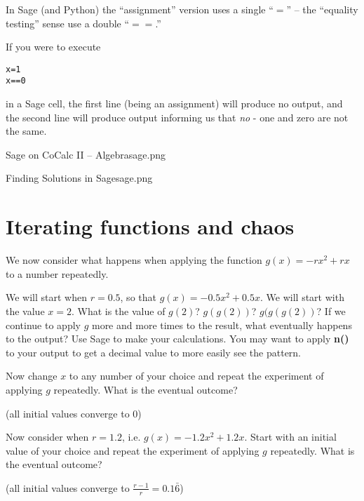 In Sage (and Python) the ``assignment'' version uses a single ``$=$'' -- the ``equality testing'' sense use a double ``$==$.''  

If you were to execute 

\begin{codeblock}
\begin{verbatim}
x=1
x==0
\end{verbatim}
\end{codeblock}

\noindent in a Sage cell, the first line (being an assignment) will produce no output, and the second line will produce output informing us that {\em no} - one and zero are not the same.


\begin{worksheet}{8}{Sage on CoCalc II -- Algebra}{sage.png}

\end{worksheet}
\clearpage

\begin{worksheet}{9}{Finding Solutions in Sage}{sage.png}

\end{worksheet}
\clearpage



\section{Iterating functions and chaos}

We now consider what happens when applying the function $g(x)=-rx^2+rx$
to a number repeatedly.

We will start when $r=0.5$, so that $g(x)=-0.5x^2+0.5x$. We will start with
the value $x=2$. What is the value of $g(2)$? $g(g(2))$? $g(g(g(2))$?
If we continue to apply $g$ more and more times to the result, what eventually
happens to the output? Use Sage to make your calculations. You may want to
apply \textbf{n()} to your output to get a decimal value to more easily
see the pattern.

Now change $x$ to any number of your choice and repeat the experiment of
applying $g$ repeatedly. What is the eventual outcome?

(all initial values converge to $0$)

Now consider when $r=1.2$, i.e. $g(x)=-1.2x^2+1.2x$.
Start with an initial value of your choice and repeat
the experiment of applying $g$ repeatedly. What is the eventual outcome?

(all initial values converge to $\frac{r-1}{r}=0.1\bar{6}$)

